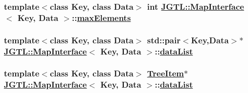 \hypertarget{class_j_g_t_l_1_1_map_interface_fd420367e3791206e3f22e9610e21afc}{
\subsubsection[maxElements]{\setlength{\rightskip}{0pt plus 5cm}template$<$class Key, class Data$>$ int \hyperlink{class_j_g_t_l_1_1_map_interface}{JGTL::Map\-Interface}$<$ Key, Data $>$::\hyperlink{class_j_g_t_l_1_1_map_interface_fd420367e3791206e3f22e9610e21afc}{max\-Elements}}}
\label{class_j_g_t_l_1_1_map_interface_fd420367e3791206e3f22e9610e21afc}


\hypertarget{class_j_g_t_l_1_1_map_interface_b2f183b5fa7244a2b85571c2a62235c1}{
\subsubsection[dataList]{\setlength{\rightskip}{0pt plus 5cm}template$<$class Key, class Data$>$ std::pair$<$Key,Data$>$$\ast$ \hyperlink{class_j_g_t_l_1_1_map_interface}{JGTL::Map\-Interface}$<$ Key, Data $>$::\hyperlink{class_j_g_t_l_1_1_map_interface_b2f183b5fa7244a2b85571c2a62235c1}{data\-List}}}
\label{class_j_g_t_l_1_1_map_interface_b2f183b5fa7244a2b85571c2a62235c1}


\hypertarget{class_j_g_t_l_1_1_map_interface_86fa704452e650dac12e3d01804739c2}{
\subsubsection[dataList]{\setlength{\rightskip}{0pt plus 5cm}template$<$class Key, class Data$>$ \hyperlink{class_j_g_t_l_1_1_map_interface_b7e9654bf9b2a906465e362475466ca5}{Tree\-Item}$\ast$ \hyperlink{class_j_g_t_l_1_1_map_interface}{JGTL::Map\-Interface}$<$ Key, Data $>$::\hyperlink{class_j_g_t_l_1_1_map_interface_b2f183b5fa7244a2b85571c2a62235c1}{data\-List}}}
\label{class_j_g_t_l_1_1_map_interface_86fa704452e650dac12e3d01804739c2}


